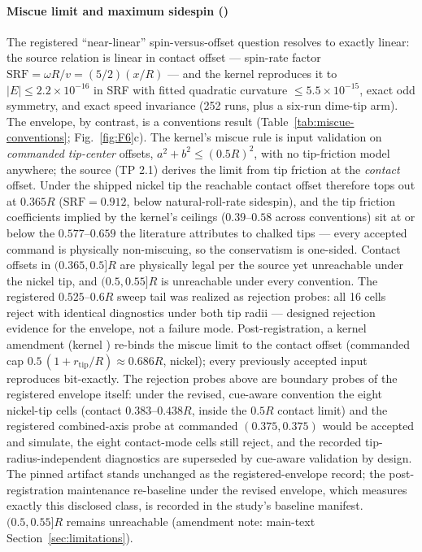 \paragraph{Miscue limit and maximum sidespin ()}
The registered ``near-linear'' spin-versus-offset question resolves to
exactly linear: the source relation is linear in contact offset ---
spin-rate factor $\mathrm{SRF} = \omega R / v = (5/2)(x/R)$ --- and the
kernel reproduces it to $|E| \le 2.2 \times 10^{-16}$ in SRF with fitted
quadratic curvature $\le 5.5 \times 10^{-15}$, exact odd symmetry, and
exact speed invariance (252 runs, plus a six-run dime-tip arm). The
envelope, by contrast, is a
conventions result (Table~\ref{tab:miscue-conventions};
Fig.~\ref{fig:F6}c). The kernel's miscue rule is input validation on
\emph{commanded tip-center} offsets, $a^2 + b^2 \le (0.5R)^2$, with no
tip-friction model anywhere; the source (TP 2.1) derives the limit from
tip friction at the \emph{contact} offset. Under the shipped nickel tip
the reachable contact offset therefore tops out at $0.365R$
($\mathrm{SRF} = 0.912$, below natural-roll-rate sidespin), and the tip
friction coefficients implied by the kernel's ceilings
($0.39$--$0.58$ across conventions) sit at or below the
$0.577$--$0.659$ the literature attributes to chalked tips --- every
accepted command is physically non-miscuing, so the conservatism is
one-sided. Contact offsets in $(0.365, 0.5]R$ are physically legal per
the source yet unreachable under the nickel tip, and $(0.5, 0.55]R$ is
unreachable under every convention. The registered $0.525$--$0.6R$
sweep tail was realized as rejection probes: all 16 cells reject with
identical diagnostics under both tip radii --- designed rejection
evidence for the envelope, not a failure mode. Post-registration, a
kernel amendment (kernel ) re-binds the miscue limit
to the contact offset (commanded cap
$0.5\,(1 + r_{\mathrm{tip}}/R) \approx 0.686R$, nickel); every
previously accepted input reproduces bit-exactly. The rejection probes
above are boundary probes of the registered envelope itself: under the
revised, cue-aware convention the eight nickel-tip cells (contact
$0.383$--$0.438R$, inside the $0.5R$ contact limit) and the registered
combined-axis probe at commanded $(0.375, 0.375)$ would be accepted
and simulate, the eight contact-mode cells still reject, and the
recorded tip-radius-independent diagnostics are superseded by
cue-aware validation by design. The pinned artifact stands unchanged
as the registered-envelope record; the post-registration maintenance
re-baseline under the revised envelope, which measures exactly this
disclosed class, is recorded in the study's baseline manifest.
$(0.5, 0.55]R$
remains unreachable (amendment note: main-text
Section~\ref{sec:limitations}).

